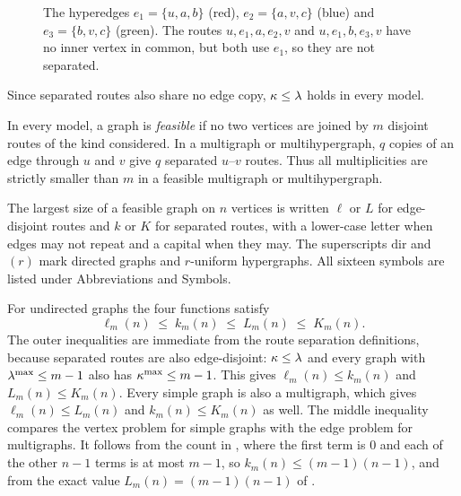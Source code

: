 \begin{figure}[ht]
\centering
{}
\caption{The hyperedges $e_1=\{u,a,b\}$ (red), $e_2=\{a,v,c\}$ (blue) and $e_3=\{b,v,c\}$ (green). The routes $u,e_1,a,e_2,v$ and $u,e_1,b,e_3,v$ have no inner vertex in common, but both use $e_1$, so they are not separated.}
\label{fig:incidence-example}
\end{figure}
Since separated routes also share no edge copy, $\kappa\le\lambda$ holds in every model.

In every model, a graph is \emph{feasible} if no two vertices are joined by $m$ disjoint routes of the kind considered.
In a multigraph or multihypergraph, $q$ copies of an edge through $u$ and $v$ give $q$ separated $u$--$v$ routes.
Thus all multiplicities are strictly smaller than $m$ in a feasible multigraph or multihypergraph.

The largest size of a feasible graph on $n$ vertices is written $\ell$ or $L$ for edge-disjoint routes and $k$ or $K$ for separated routes, with a lower-case letter when edges may not repeat and a capital when they may.
The superscripts $\mathrm{dir}$ and $(r)$ mark directed graphs and $r$-uniform hypergraphs.
All sixteen symbols are listed under Abbreviations and Symbols.

For undirected graphs the four functions satisfy
\[
    \ell_m(n)\;\le\; k_m(n)\;\le\; L_m(n)\;\le\; K_m(n).
\]
The outer inequalities are immediate from the route separation definitions, because separated routes are also edge-disjoint: $\kappa\le\lambda$ and every graph with $\lambda^{\max}\le m-1$ also has $\kappa^{\max}\le m-1$. This gives $\ell_m(n)\le k_m(n)$ and $L_m(n)\le K_m(n)$. Every simple graph is also a multigraph, which gives $\ell_m(n)\le L_m(n)$ and $k_m(n)\le K_m(n)$ as well.
The middle inequality compares the vertex problem for simple graphs with the edge problem for multigraphs. It follows from the count in , where the first term is $0$ and each of the other $n-1$ terms is at most $m-1$, so $k_m(n)\le(m-1)(n-1)$, and from the exact value $L_m(n)=(m-1)(n-1)$ of .


